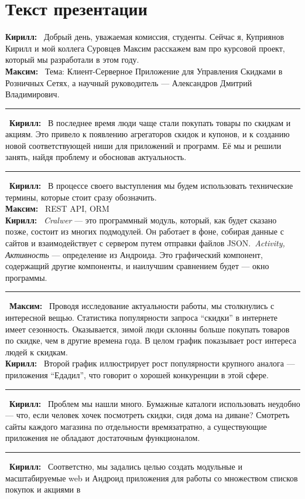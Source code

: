 \documentclass[12pt]{article}
\newcommand{\kir}{\textbf{Кирилл: }}
\renewcommand{\max}{\textbf{Максим: }}
\renewcommand{\line}{\noindent\rule{\textwidth}{1pt}}
\begin{document}
\section*{Текст презентации}

\kir\ Добрый день, уважаемая комиссия, студенты. Сейчас я, Куприянов Кирилл и мой
коллега Суровцев Максим расскажем вам про курсовой проект, который мы
разработали в этом году.\\
\max\ Тема: Клиент-Серверное Приложение для Управления Скидками в Розничных
Сетях, а научный руководитель --- Александров Дмитрий Владимирович.\\
\line\
\kir\ В последнее время люди чаще стали покупать товары по скидкам и акциям. Это
привело к появлению агрегаторов скидок и купонов, и к созданию новой
соответствующей ниши для приложений и программ. Её мы и решили занять, найдя
проблему и обосновав актуальность.\\
\line\
\kir\ В процессе своего выступления мы будем использовать технические термины,
которые стоит сразу обозначить.\\
\max\ REST API, ORM\\
\kir\ \textit{Cralwer} --- это программный модуль,
который, как будет сказано позже, состоит из многих подмодулей. Он работает в
фоне, собирая данные с сайтов и взаимодействует с сервером путем отправки
файлов JSON.\ \textit{Activity, Активность} ---
определение из Андроида. Это графический компонент, содержащий другие
компоненты, и наилучшим сравнением будет --- окно программы.\\
\line\
\max\ Проводя исследование актуальности работы, мы столкнулись с интересной вещью.
Статистика популярности запроса ``скидки'' в интернете имеет сезонность.
Оказывается, зимой люди склонны больше покупать товаров по скидке, чем в другие
времена года. В целом график показывает рост интереса людей к скидкам.\\
\kir\ Второй график иллюстрирует рост популярности крупного аналога ---
приложения ``Едадил'', что говорит о хорошей конкуренции в этой сфере.\\
\line\
\kir\ Проблем мы нашли много. Бумажные каталоги использовать неудобно --- что,
если человек хочек посмотреть скидки, сидя дома на диване? Смотреть сайты
каждого магазина по отдельности времязатратно, а существующие приложения не
обладают достаточным функционалом.\\
\line\
\kir\ Соответстно, мы задались целью создать модульные и масштабируемые web и
Андроид приложения для работы со множеством списков покупок и акциями в
\end{document}
